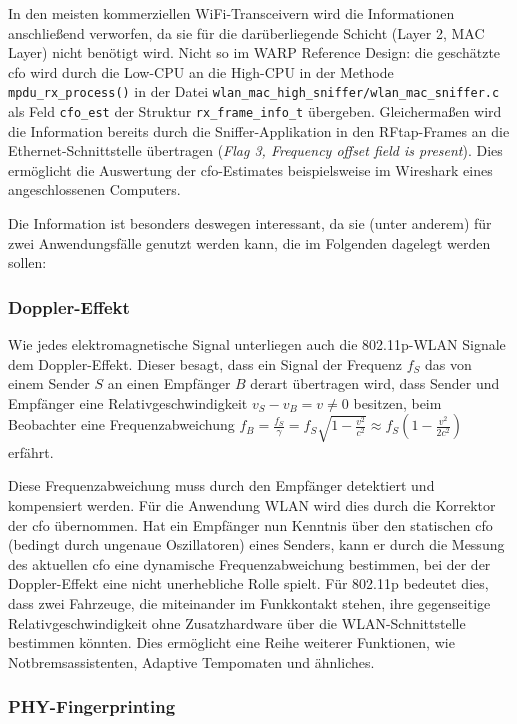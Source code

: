\documentclass[letterpaper,11pt,ngerman]{article}
\begin{document}
\begin{onehalfspace}
In den meisten kommerziellen WiFi-Transceivern wird die Informationen
anschließend verworfen, da sie für die darüberliegende Schicht (Layer 2,
MAC Layer) nicht benötigt wird. Nicht so im WARP Reference Design: die
geschätzte \ac{cfo} wird durch die Low-CPU an die High-CPU in der
Methode \texttt{mpdu\_rx\_process()} in der Datei
\texttt{wlan\_mac\_high\_sniffer/wlan\_mac\_sniffer.c} als Feld
\texttt{cfo\_est} der Struktur \texttt{rx\_frame\_info\_t} übergeben.
Gleichermaßen wird die Information bereits durch die Sniffer-Applikation
in den RFtap-Frames an die Ethernet-Schnittstelle übertragen (\emph{Flag
3, Frequency offset field is present}). Dies ermöglicht die Auswertung
der \ac{cfo}-Estimates beispielsweise im Wireshark eines angeschlossenen
Computers.

Die Information ist besonders deswegen interessant, da sie (unter
anderem) für zwei Anwendungsfälle genutzt werden kann, die im Folgenden
dagelegt werden sollen:

\subsubsection{Doppler-Effekt}
\label{doppler-effekt}

Wie jedes elektromagnetische Signal unterliegen auch die 802.11p-WLAN
Signale dem Doppler-Effekt. Dieser besagt, dass ein Signal der Frequenz
\(f_S\) das von einem Sender \(S\) an einen Empfänger \(B\) derart
übertragen wird, dass Sender und Empfänger eine Relativgeschwindigkeit
\(v_S - v_B = v \neq 0\) besitzen, beim Beobachter eine
Frequenzabweichung
\(f_{B} = \frac{f_{S}}{\gamma} = f_{S} \sqrt{1-\frac{v^2}{c^2}} \approx f_{S} \left(1 - \frac{v^2}{2c^2}\right)\)
erfährt.

Diese Frequenzabweichung muss durch den Empfänger detektiert und
kompensiert werden. Für die Anwendung WLAN wird dies durch die Korrektor
der \ac{cfo} übernommen. Hat ein Empfänger nun Kenntnis über den
statischen \ac{cfo} (bedingt durch ungenaue Oszillatoren) eines Senders,
kann er durch die Messung des aktuellen \ac{cfo} eine dynamische
Frequenzabweichung bestimmen, bei der der Doppler-Effekt eine nicht
unerhebliche Rolle spielt. Für 802.11p bedeutet dies, dass zwei
Fahrzeuge, die miteinander im Funkkontakt stehen, ihre gegenseitige
Relativgeschwindigkeit ohne Zusatzhardware über die WLAN-Schnittstelle
bestimmen könnten. Dies ermöglicht eine Reihe weiterer Funktionen, wie
Notbremsassistenten, Adaptive Tempomaten und ähnliches.

\subsubsection{PHY-Fingerprinting}
\label{phy-fingerprinting}


\end{onehalfspace}
\end{document}

